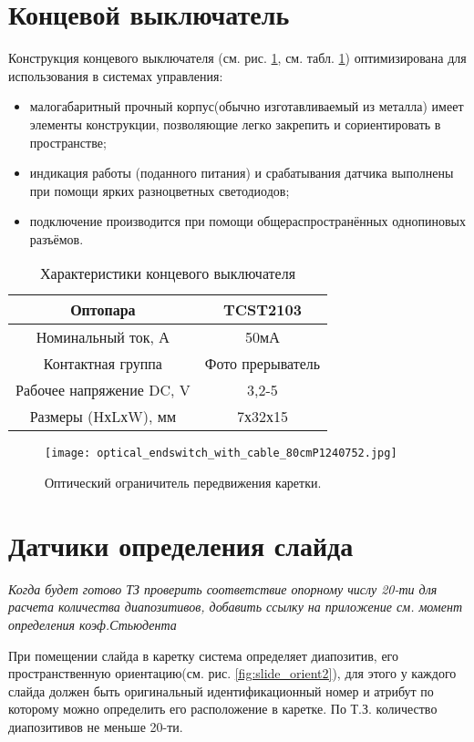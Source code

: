 \section{Концевой выключатель}
Конструкция концевого выключателя (см. рис. \ref{fig:optical_end}, см. табл. \ref{tab:optical_end}) оптимизирована для использования в системах управления:
\begin{itemize}
\item малогабаритный прочный корпус(обычно изготавливаемый из металла) имеет элементы конструкции, позволяющие легко закрепить и сориентировать в пространстве;
\item индикация работы (поданного питания) и срабатывания датчика выполнены при помощи ярких разноцветных светодиодов;
\item подключение производится при помощи общераспространённых однопиновых разъёмов.
\end{itemize}
\begin{table}
	\centering
	\begin{tabular}{|c|c|}
	\hline 
	Оптопара & TCST2103 \\ 
	\hline 
	Номинальный ток, А & 50мА \\ 
	\hline 
	Контактная группа & Фото прерыватель \\ 
	\hline 
	Рабочее напряжение DC, V & 3,2-5 \\ 
	\hline 
	Размеры (HхLхW), мм & 7х32х15 \\ 
	\hline 
	\end{tabular} 
	\caption{Характеристики концевого выключателя}
	\label{tab:optical_end}
\end{table}

\begin{figure}[ht]
	\centering
     \texttt{[image: optical\_endswitch\_with\_cable\_80cmP1240752.jpg]}
	\caption{Оптический ограничитель передвижения каретки.}
	\label{fig:optical_end}
\end{figure}

\section{Датчики определения слайда}
\textit{Когда будет готово ТЗ проверить соответствие опорному числу 20-ти для расчета количества диапозитивов, добавить ссылку на приложение см. момент определения коэф.Стьюдента}

При помещении слайда в каретку система определяет диапозитив, его пространственную ориентацию(см. рис. \ref{fig:slide_orient2}), для этого у каждого слайда должен быть оригинальный идентификационный номер и атрибут по которому можно определить его расположение в каретке. По Т.З. количество диапозитивов не меньше 20-ти.

